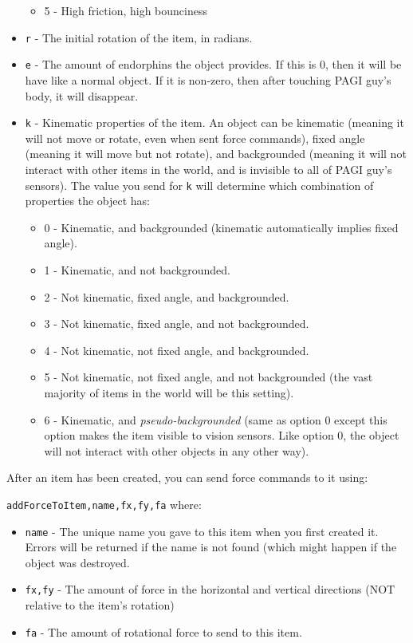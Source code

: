 \begin{itemize}
\begin{itemize}
	\item 5 - High friction, high bounciness
	\end{itemize}
\item \texttt{r} - The initial rotation of the item, in radians. 
\item \texttt{e} - The amount of endorphins the object provides. If this is 0, then it will be have like a normal object. If it is non-zero, then after touching PAGI guy's body, it will disappear.
\item \texttt{k} - Kinematic properties of the item. An object can be kinematic (meaning it will not move or rotate, even when sent force commands), fixed angle (meaning it will move but not rotate), and backgrounded (meaning it will not interact with other items in the world, and is invisible to all of PAGI guy's sensors). The value you send for \texttt{k} will determine which combination of properties the object has:
	\begin{itemize}
	\item 0 - Kinematic, and backgrounded (kinematic automatically implies fixed angle).
	\item 1 - Kinematic, and not backgrounded. 
	\item 2 - Not kinematic, fixed angle, and backgrounded.
	\item 3 - Not kinematic, fixed angle, and not backgrounded.
	\item 4 - Not kinematic, not fixed angle, and backgrounded.
	\item 5 - Not kinematic, not fixed angle, and not backgrounded (the vast majority of items in the world will be this setting).
	\item 6 - Kinematic, and \textit{pseudo-backgrounded} (same as option 0 except this option makes the item visible to vision sensors. Like option 0, the object will not interact with other objects in any other way).
	\end{itemize}
\end{itemize}

After an item has been created, you can send force commands to it using:

\texttt{addForceToItem,name,fx,fy,fa} where:

\begin{itemize}
\item \texttt{name} - The unique name you gave to this item when you first created it. Errors will be returned if the name is not found (which might happen if the object was destroyed.
\item \texttt{fx,fy} - The amount of force in the horizontal and vertical directions (NOT relative to the item's rotation)
\item \texttt{fa} - The amount of rotational force to send to this item.
\end{itemize}

